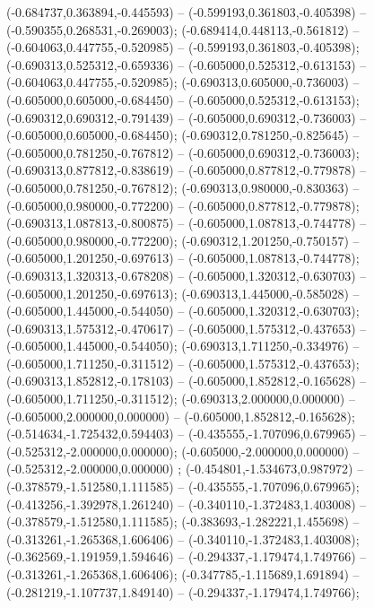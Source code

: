  (-0.684737,0.363894,-0.445593) -- (-0.599193,0.361803,-0.405398) -- (-0.590355,0.268531,-0.269003);
 (-0.689414,0.448113,-0.561812) -- (-0.604063,0.447755,-0.520985) -- (-0.599193,0.361803,-0.405398);
 (-0.690313,0.525312,-0.659336) -- (-0.605000,0.525312,-0.613153) -- (-0.604063,0.447755,-0.520985);
 (-0.690313,0.605000,-0.736003) -- (-0.605000,0.605000,-0.684450) -- (-0.605000,0.525312,-0.613153);
 (-0.690312,0.690312,-0.791439) -- (-0.605000,0.690312,-0.736003) -- (-0.605000,0.605000,-0.684450);
 (-0.690312,0.781250,-0.825645) -- (-0.605000,0.781250,-0.767812) -- (-0.605000,0.690312,-0.736003);
 (-0.690313,0.877812,-0.838619) -- (-0.605000,0.877812,-0.779878) -- (-0.605000,0.781250,-0.767812);
 (-0.690313,0.980000,-0.830363) -- (-0.605000,0.980000,-0.772200) -- (-0.605000,0.877812,-0.779878);
 (-0.690313,1.087813,-0.800875) -- (-0.605000,1.087813,-0.744778) -- (-0.605000,0.980000,-0.772200);
 (-0.690312,1.201250,-0.750157) -- (-0.605000,1.201250,-0.697613) -- (-0.605000,1.087813,-0.744778);
 (-0.690313,1.320313,-0.678208) -- (-0.605000,1.320312,-0.630703) -- (-0.605000,1.201250,-0.697613);
 (-0.690313,1.445000,-0.585028) -- (-0.605000,1.445000,-0.544050) -- (-0.605000,1.320312,-0.630703);
 (-0.690313,1.575312,-0.470617) -- (-0.605000,1.575312,-0.437653) -- (-0.605000,1.445000,-0.544050);
 (-0.690313,1.711250,-0.334976) -- (-0.605000,1.711250,-0.311512) -- (-0.605000,1.575312,-0.437653);
 (-0.690313,1.852812,-0.178103) -- (-0.605000,1.852812,-0.165628) -- (-0.605000,1.711250,-0.311512);
 (-0.690313,2.000000,0.000000) -- (-0.605000,2.000000,0.000000) -- (-0.605000,1.852812,-0.165628);
 (-0.514634,-1.725432,0.594403) -- (-0.435555,-1.707096,0.679965) -- (-0.525312,-2.000000,0.000000);
 (-0.605000,-2.000000,0.000000) -- (-0.525312,-2.000000,0.000000) ;
 (-0.454801,-1.534673,0.987972) -- (-0.378579,-1.512580,1.111585) -- (-0.435555,-1.707096,0.679965);
 (-0.413256,-1.392978,1.261240) -- (-0.340110,-1.372483,1.403008) -- (-0.378579,-1.512580,1.111585);
 (-0.383693,-1.282221,1.455698) -- (-0.313261,-1.265368,1.606406) -- (-0.340110,-1.372483,1.403008);
 (-0.362569,-1.191959,1.594646) -- (-0.294337,-1.179474,1.749766) -- (-0.313261,-1.265368,1.606406);
 (-0.347785,-1.115689,1.691894) -- (-0.281219,-1.107737,1.849140) -- (-0.294337,-1.179474,1.749766);
